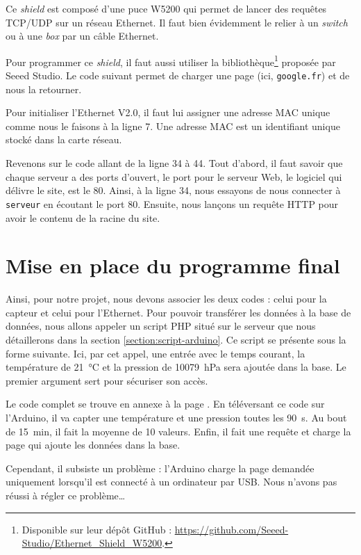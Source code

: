 Ce \emph{shield} est composé d'une puce W5200 qui permet de lancer des requêtes TCP/UDP sur un réseau Ethernet. Il faut bien évidemment le relier à un \emph{switch} ou à une \emph{box} par un câble Ethernet.

Pour programmer ce \emph{shield}, il faut aussi utiliser la bibliothèque\footnote{Disponible sur leur dépôt GitHub : \url{https://github.com/Seeed-Studio/Ethernet_Shield_W5200}.} proposée par Seeed Studio. Le code suivant permet de charger une page (ici, \verb-google.fr-) et de nous la retourner.


Pour initialiser l'Ethernet V2.0, il faut lui assigner une adresse MAC unique comme nous le faisons à la ligne 7. Une adresse MAC est un identifiant unique stocké dans la carte réseau.

Revenons sur le code allant de la ligne 34 à 44. Tout d'abord, il faut savoir que chaque serveur a des ports d'ouvert, le port pour le serveur Web, le logiciel qui délivre le site, est le 80. Ainsi, à la ligne 34, nous essayons de nous connecter à \verb-serveur- en écoutant le port 80. Ensuite, nous lançons un requête HTTP pour avoir le contenu de la racine du site.

\section{Mise en place du programme final}
\label{section:url-arduino}

Ainsi, pour notre projet, nous devons associer les deux codes : celui pour la capteur et celui pour l'Ethernet. Pour pouvoir transférer les données à la base de données, nous allons appeler un script PHP situé sur le serveur que nous détaillerons dans la section \ref{section:script-arduino}. Ce script se présente sous la forme suivante.
Ici, par cet appel, une entrée avec le temps courant, la température de \SI{21}{\celsius} et la pression de \SI{10079}{\hecto\pascal} sera ajoutée dans la base. Le premier argument sert pour sécuriser son accès.

\Espace

Le code complet se trouve en annexe à la page \pageref{code:arduino}. En téléversant ce code sur l'Arduino, il va capter une température et une pression toutes les \SI{90}{\second}. Au bout de \SI{15}{\minute}, il fait la moyenne de 10 valeurs. Enfin, il fait une requête et charge la page qui ajoute les données dans la base.

Cependant, il subsiste un problème : l'Arduino charge la page demandée uniquement lorsqu'il est connecté à un ordinateur par USB. Nous n'avons pas réussi à régler ce problème\dots
